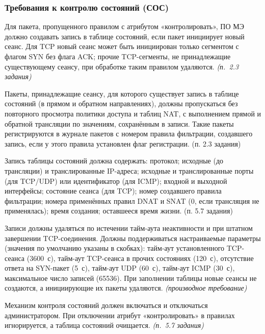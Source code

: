 \documentclass[12pt,a4paper,final]{article}
\newenvironment{reqs}
  {\begin{description}[style=sameline,leftmargin=2.2cm,labelwidth=2.0cm,
     labelsep=0.2cm,font=\normalfont\bfseries,itemsep=3pt]}
  {\end{description}}
\newcommand{\src}[1]{\textit{(п.~#1 задания)}}
\newcommand{\der}{\textit{(производное требование)}}
\begin{document}
\subsubsection{Требования к контролю состояний (СОС)}

\begin{reqs}
\item[СОС-01] Для пакета, пропущенного правилом с атрибутом «контролировать»,
  ПО МЭ должно создавать запись в таблице состояний, если пакет инициирует новый
  сеанс. Для TCP новый сеанс может быть инициирован только сегментом с флагом SYN
  без флага ACK; прочие TCP-сегменты, не принадлежащие существующему сеансу,
  при обработке таким правилом удаляются. \src{2.3}
\item[СОС-02]Пакеты, принадлежащие сеансу, для которого существует запись
в таблице состояний (в прямом и обратном направлениях), должны
пропускаться без повторного просмотра политики доступа и таблиц NAT, с
выполнением прямой и обратной трансляции по значениям, сохранённым в
записи. Такие пакеты регистрируются в журнале пакетов с номером правила
фильтрации, создавшего запись, если у этого правила установлен флаг
регистрации. (п. 2.3 задания)
\item[СОС-03] Запись таблицы состояний должна содержать: протокол;
исходные (до трансляции) и транслированные IP-адреса; исходные и
транслированные порты (для TCP/UDP) или идентификатор (для ICMP); входной
и выходной интерфейсы; состояние сеанса (для TCP); номер создавшего
правила фильтрации; номера применённых правил DNAT и SNAT (0, если
трансляция не применялась); время создания; оставшееся время жизни.
(п. 5.7 задания)
\item[СОС-04] Записи должны удаляться по истечении тайм-аута неактивности
  и при штатном завершении TCP-соединения. Должны поддерживаться настраиваемые
  параметры (значения по умолчанию указаны в скобках): тайм-аут установленного
  TCP-сеанса (3600~с), тайм-аут TCP-сеанса в прочих состояниях (120~с), отсутствие ответа на SYN-пакет (5~с),
  тайм-аут UDP (60~с), тайм-аут ICMP (30~с), максимальное число записей (65536).
  При заполнении таблицы новые сеансы не создаются, а инициирующие их пакеты
  удаляются. \der
\item[СОС-05] Механизм контроля состояний должен включаться и отключаться
  администратором. При отключении атрибут «контролировать» в правилах
  игнорируется, а таблица состояний очищается. \src{5.7}
\end{reqs}
\end{document}

